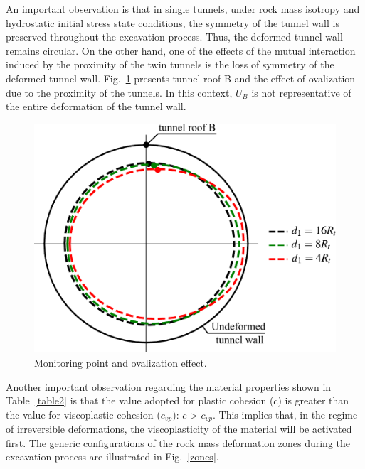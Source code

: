 \documentclass[a4paper,fleqn]{cas-sc}
\begin{document}
An important observation is that in single tunnels, under rock mass isotropy and hydrostatic initial stress state conditions, the symmetry of the tunnel wall is preserved throughout the excavation process. Thus, the deformed tunnel wall remains circular. On the other hand, one of the effects of the mutual interaction induced by the proximity of the twin tunnels is the loss of symmetry of the deformed tunnel wall. Fig.~\ref{Ovalization effect and monitoring point} presents tunnel roof B and the effect of ovalization due to the proximity of the tunnels. In this context, $U_B$ is not representative of the entire deformation of the tunnel wall.
\begin{figure}[h!]
	\centering
	\includegraphics[scale=0.5]{Ovalization effect and monitoring point.pdf}
	\caption{Monitoring point and ovalization effect.}
	\label{Ovalization effect and monitoring point}
\end{figure}
\FloatBarrier

Another important observation regarding the material properties shown in Table~\ref{table2} is that the value adopted for plastic cohesion ($c$) is greater than the value for viscoplastic cohesion ($c_{vp}$): $c$ > $c_{vp}$. This implies that, in the regime of irreversible deformations, the viscoplasticity of the material will be activated first. The generic configurations of the rock mass deformation zones during the excavation process are illustrated in Fig.~\ref{zones}.
\end{document}
